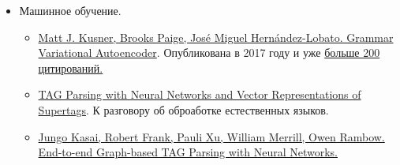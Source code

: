 \begin{itemize}
  \item Машинное обучение.
   \begin{itemize}
      \item \href{https://arxiv.org/abs/1703.01925}{Matt J. Kusner, Brooks Paige, José Miguel Hernández-Lobato. Grammar Variational Autoencoder}. Опубликована в 2017 году и уже \href{https://scholar.google.com/scholar?cites=4080460899049502885&as_sdt=2005&sciodt=0,5&hl=ru}{больше 200 цитирований.}
      \item \href{https://www.aclweb.org/anthology/D17-1180.pdf}{TAG Parsing with Neural Networks and Vector Representations of Supertags}. К разговору об оброаботке естественных языков.
      \item \href{https://arxiv.org/abs/1804.06610}{Jungo Kasai, Robert Frank, Pauli Xu, William Merrill, Owen Rambow. End-to-end Graph-based TAG Parsing with Neural Networks.}
    \end{itemize}


\end{itemize}
